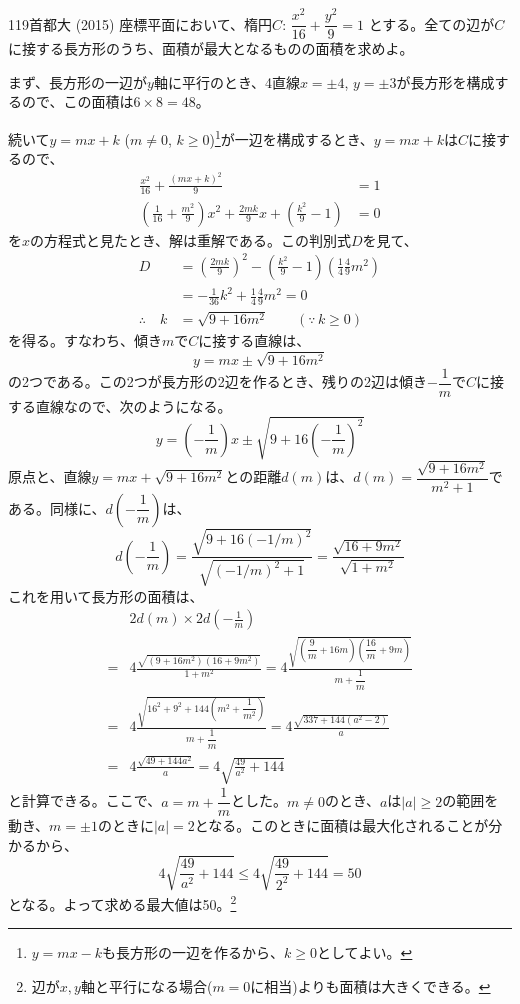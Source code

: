 \begin{prob}{119}{}{首都大 (2015)}
 座標平面において、楕円$C$: $\dfrac{x^2}{16}+\dfrac{y^2}{9}=1$ とする。全ての辺が$C$に接する長方形のうち、面積が最大となるものの面積を求めよ。
\end{prob}
まず、長方形の一辺が$y$軸に平行のとき、4直線$x=\pm 4$, $y=\pm 3$が長方形を構成するので、この面積は$6\times 8=48$。

続いて$y=mx+k$ ($m\neq 0$, $k\ge 0$)\footnote{$y=mx-k$も長方形の一辺を作るから、$k\ge 0$としてよい。}が一辺を構成するとき、$y=mx+k$は$C$に接するので、
\begin{align*}
 \frac{x^2}{16}+\frac{(mx+k)^2}{9}&=1 \\
 \left(\frac{1}{16}+\frac{m^2}{9}\right)x^2+\frac{2mk}{9}x+\left(\frac{k^2}{9}-1\right)&=0
\end{align*}
を$x$の方程式と見たとき、解は重解である。この判別式$D$を見て、
\begin{align*}
 D&=\left(\frac{2mk}{9}\right)^2-\left(\frac{k^2}{9}-1\right)\left(\frac{1}{4}\frac{4}{9}m^2\right) \\
 &=-\frac{1}{36}k^2+\frac{1}{4}\frac{4}{9}m^2=0 \\
 \therefore\quad k&=\sqrt{9+16m^2} \qquad (\because\, k\ge 0)
\end{align*}
を得る。すなわち、傾き$m$で$C$に接する直線は、
\[ y=mx\pm\sqrt{9+16m^2} \]
の2つである。この2つが長方形の2辺を作るとき、残りの2辺は傾き$-\dfrac{1}{m}$で$C$に接する直線なので、次のようになる。
\[ y=\left(-\frac{1}{m}\right)x\pm\sqrt{9+16\left(-\frac{1}{m}\right)^2} \]
原点と、直線$y=mx+\sqrt{9+16m^2}$との距離$d(m)$は、$d(m)=\dfrac{\sqrt{9+16m^2}}{m^2+1}$である。同様に、$d\left(-\dfrac{1}{m}\right)$は、
\[ d\left(-\frac{1}{m}\right)=\frac{\sqrt{9+16(-1/m)^2}}{\sqrt{(-1/m)^2+1}}=\frac{\sqrt{16+9m^2}}{\sqrt{1+m^2}} \]
これを用いて長方形の面積は、
\begin{align*}
 &2d(m)\times2d\left(-\frac{1}{m}\right) \\
 =& 4 \frac{\sqrt{(9+16m^2)(16+9m^2)}}{1+m^2}=4\frac{\sqrt{\left(\dfrac{9}{m}+16m\right)\left(\dfrac{16}{m}+9m\right)}}{m+\dfrac{1}{m}} \\
 =& 4 \frac{\sqrt{16^2+9^2+144\left(m^2+\dfrac{1}{m^2}\right)}}{m+\dfrac{1}{m}}=4 \frac{\sqrt{337+144(a^2-2)}}{a} \\
 =& 4 \frac{\sqrt{49+144a^2}}{a}=4\sqrt{\frac{49}{a^2}+144}
\end{align*}
と計算できる。ここで、$a=m+\dfrac{1}{m}$とした。$m\neq 0$のとき、$a$は$|a|\ge 2$の範囲を動き、$m=\pm 1$のときに$|a|=2$となる。このときに面積は最大化されることが分かるから、
\[ 4\sqrt{\frac{49}{a^2}+144}\le 4\sqrt{\frac{49}{2^2}+144}=50 \]
となる。よって求める最大値は50。\footnote{辺が$x,y$軸と平行になる場合($m=0$に相当)よりも面積は大きくできる。}

